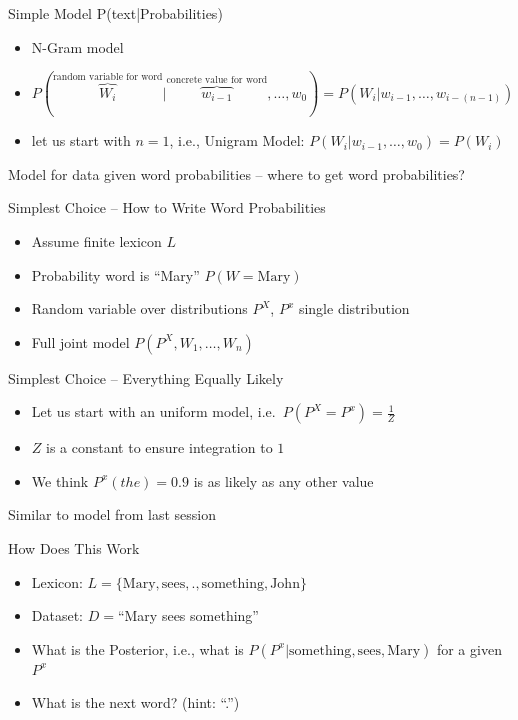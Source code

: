 \documentclass[11pt]{beamer}
\begin{document}
	\begin{frame}{Simple Model P(text|Probabilities)}
		\begin{itemize}
			\item N-Gram model
			\item $P(\overbrace{W_i}^{\text{random variable for word}}|\overbrace{w_{i-1}}^{\text{concrete value for word}},\dots,w_{0}) = P(W_i|w_{i-1},\dots,w_{i-(n-1)})$
			\item let us start with $n=1$, i.e., Unigram Model: $P(W_i|w_{i-1},\dots,w_{0}) = P(W_i)$ 
		\end{itemize}
		
		\vspace{10pt}Model for data given word probabilities -- where to get word probabilities?
	\end{frame}
	
	\begin{frame}{Simplest Choice -- How to Write Word Probabilities}
		\begin{itemize}
			\item Assume finite lexicon $L$
			\item Probability word is ``Mary''  $P(W = \text{Mary})$
			\item Random variable over distributions $P^X$, $P^x$ single distribution
			\item Full joint model $P\left( P^{X},W_1,\dots,W_n \right)$
		\end{itemize}
	\end{frame}
	
	\begin{frame}{Simplest Choice -- Everything Equally Likely}
		\begin{itemize}
			\item Let us start with an uniform model, i.e.\ $P\left( P^X = P^{x} \right) = \frac{1}{Z}$
			\item $Z$ is a constant to ensure integration to $1$
			\item We think $P^{x}(the) = 0.9$ is as likely as any other value
		\end{itemize}
		
		\vspace{10pt}Similar to model from last session
	\end{frame}
	
	\begin{frame}{How Does This Work}
		\begin{itemize}
			\item Lexicon: $L = \lbrace \text{Mary}, \text{sees}, \text{.}, \text{something}, \text{John}  \rbrace$
			\item Dataset: $D=$``Mary sees something''
			\item What is the Posterior, i.e., what is $P(P^x | \text{something},\text{sees},\text{Mary})$ for a given $P^x$
			\item What is the next word? (hint: ``.'')
		\end{itemize}
	\end{frame}
	
\end{document}
